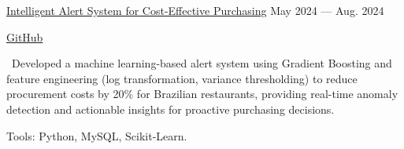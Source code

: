 
\begin{cvskillsnoncentered}

  \cvskill
    {\href{https://github.com/AshuDSAI/DS_Project}{Intelligent Alert System for Cost-Effective Purchasing}}
    {May 2024 --- Aug. 2024}

  \cvskill
    {}
    {\href{https://github.com/AshuDSAI/DS_Project}{GitHub}}

  \cvskill
    {}
    {\textbullet\ Developed a machine learning-based alert system using Gradient Boosting and feature engineering (log transformation, variance thresholding) to reduce procurement costs by 20\% for Brazilian restaurants, providing real-time anomaly detection and actionable insights for proactive purchasing decisions.}

  \cvskill
    {}
    {Tools: Python, MySQL, Scikit-Learn.}

\end{cvskillsnoncentered}
